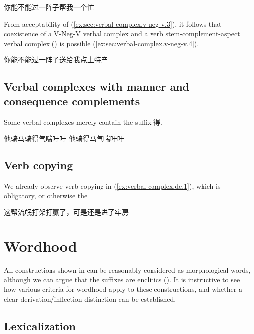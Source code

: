 \documentclass[UTF8, a4paper, oneside, scheme=plain, 12pt]{ctexrep}
\begin{document}
\begin{exe}
    \ex\label{ex:sec:verbal-complex.v-neg-v.3} 你能不能过一阵子帮我一个忙
\end{exe}

From acceptability of (\ref{ex:sec:verbal-complex.v-neg-v.3}),
it follows that coexistence of a V-Neg-V verbal complex
and a verb stem-complement-aspect verbal complex ()
is possible (\ref{ex:sec:verbal-complex.v-neg-v.4}).

\begin{exe}
    \ex\label{ex:sec:verbal-complex.v-neg-v.4} 你能不能过一阵子送给我点土特产
\end{exe}

\subsection{Verbal complexes with manner and consequence complements}
\label{sec:verbal-complex.de}

Some verbal complexes merely contain the suffix 得.


\begin{exe}
    \ex\label{ex:verbal-complex.de.1} 他骑马骑得气喘吁吁
    \ex 他骑得马气喘吁吁
\end{exe}

\subsection{Verb copying}

We already observe verb copying in (\ref{ex:verbal-complex.de.1}),
which is obligatory, or otherwise the 

\begin{exe}
    \ex 这帮流氓打架打赢了，可是还是进了牢房
\end{exe}

\section{Wordhood}\label{sec:verbal-complex.wordhood}

All constructions shown in 
can be reasonably considered as morphological words,
although we can argue that the suffixes are enclitics
().
It is instructive to see how various criteria for wordhood apply to these constructions,
and whether a clear derivation/inflection distinction can be established.

\subsection{Lexicalization}
\end{document}
